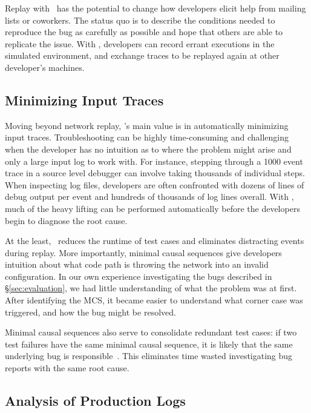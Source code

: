 Replay with \projectname~has the potential to change how developers elicit help from
mailing lists or coworkers. The status quo is to describe the conditions needed to
reproduce the bug as carefully as possible and hope that others are able
to replicate the issue. With \projectname, developers can record errant executions in the simulated
environment, and exchange traces to be replayed again at other
developer's machines.

\subsection{Minimizing Input Traces}

Moving beyond network replay, \projectname's main value is in
automatically minimizing input traces.
Troubleshooting can be highly time-consuming and challenging
when the developer has no intuition as to where the problem might arise and
only a large input log to work with.
For instance, stepping through a 1000 event trace in a source level debugger
can involve taking thousands of individual steps. When inspecting log files,
developers are often confronted
with dozens of lines of debug output per event and hundreds of thousands of
log lines overall.
With \simulator, much of the heavy lifting can be performed automatically
before the developers begin to diagnose the root cause.

At the least, \simulator~reduces the runtime of test cases and eliminates
distracting events during replay. More importantly, minimal causal sequences
give developers intuition about what code path is throwing
the network into an invalid configuration. In our own experience
investigating the bugs described in \S\ref{sec:evaluation}, we had little
understanding of what the problem was at first. After identifying the MCS, it
became easier to understand what corner case was triggered, and how the
bug might be resolved.

Minimal causal sequences also serve to consolidate redundant test cases:
if two test failures have the same minimal causal sequence, it is
likely that the same underlying bug is
responsible~\cite{Zeller:2002:SIF:506201.506206}.
This eliminates time wasted
investigating bug reports with the same root cause.

\subsection{Analysis of Production Logs}

